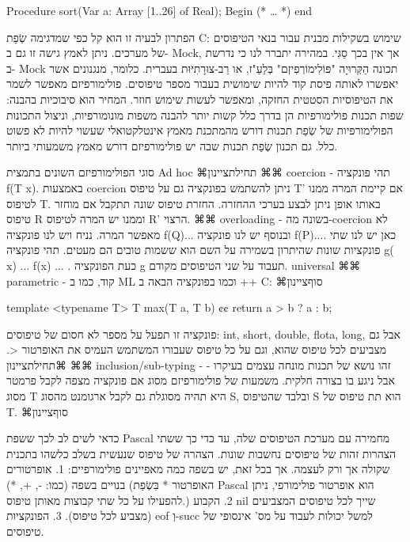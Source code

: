       Procedure sort(Var a: Array [1..26] of Real);
      Begin
      (* … *)
      end

      הפתרון לבעיה זו הוא קל כפי שמדגימה שְׂפַת C: שימוש בשקילות מבנית עבור בנאי הטיפוסים של מערכים. ניתן לאמץ גישה זו גם ב- Mock, אך אין בכך סַגִּי. במהירה יתברר לנו כי נדרשת ב- Mock תכונה הַקְּרוּיָה "פּוֹלִימוֹרְפִיזְם" בְּלַעַ"ז, או רַב-צוּרָתִיּוּת בעברית. כלומר, מנגנונים אשר יאפשרו לאותה פיסת קוד להיות שימושית בעבור מספר טיפוסים. פולימורפיזם מאפשר לשמר את הטיפוסיות הסטטית החזקה, ומאפשר לעשות שימוש חוזר.
      המחיר הוא סיבוכיות בהבנה: שפות תכנות פולימורפיות הן בדרך כלל קשות יותר להבנה משפות מונומורפיות, וניצול התכונות הפולימורפיות של שְׂפַת תכנות דורש מהמתכנת מאמץ אינטלקטואלי שעשוי להיות לא פשוט כלל. גם תכנון שְׂפַת תכנות שבה יש פולימורפיזם דורש מאמץ משמעותי ביותר.

      סוגי הפולימורפיזם השונים בתמצית
      Ad hoc
      ⌘תחילת{ציינון}
      ⌘⌘ coercion - תהי פונקציה f(T x){}. באמצעות coercion ניתן להשתמש בפונקציה גם על טיפוס T' אם קיימת המרה ממנו לטיפוס T. באותו אופן ניתן לבצע בערכי ההחזרה.
      החזרת טיפוס שונה תתקבל אם מוחזר טיפוס R וממנו יש המרה לטיפוס R' הרצוי.
      ⌘⌘ overloading - בשונה מה-coercion לא מאפשר המרה. נניח ויש לנו פונקציה f(Q){...} ובנוסף יש לנו פונקציה f(P){...}. כאן יש לנו שתי פונקציות שונות שהיתרון בשמירה על השם הוא ששמות טובים הם מעטים.
      תהי פונקציה g( x){ ... f(x) ... }. כעת הפונקציה g תעבוד על שני הטיפוסים מקודם.
      universal
      ⌘⌘ parametric - קוד, כמו ב ML וכמו בפונקציה הבאה ב ++ C:
    ⌘סוף{ציינון}

      template <typename T>
      T max(T a, T b) {¢¢
        return a > b ? a : b;
      }

      פונקציה זו תפעל על מספר לא חסום של טיפוסים: int, short, double, flota, long, אבל גם מצביעים לכל טיפוס שהוא, וגם על כל טיפוס שעבורו המשתמש העמיס את האופרטור <.
      ⌘תחילת{ציינון}
      ⌘⌘ inclusion/sub-typing - זהו נושא של תכנות מונחה עצמים בעיקרו - אבל ניגע בו בצורה חלקית. משמעות של פולימורפיזם מסוג אם פונקציה מצפה לקבל פרמטר מסוג T היא תהיה מסוגלת גם לקבל ארגומנט מהסוג S, ובלבד שהטיפוס S הוא תת טיפוס של T.
    ⌘סוף{ציינון}

      כדאי לשים לב לכך ששפת Pascal מחמירה עם מערכת הטיפוסים שלה, עד כדי כך ששתי הצהרות זהות של טיפוסים נחשבות שונות. הצהרה של טיפוס שנעשית בשלב כלשהו בתכנית שקולה אך ורק לעצמה. אך בכל זאת, יש בשפה כמה מאפיינים פולימורפיים:
      1. אופרטורים בנויים בשפה (כמו: -, +, *) (האופרטור * בִּשְׂפַת Pascal הוא אופרטור פולימורפי, ניתן להפעילו על כל שתי קבוצות מאותן טיפוס.)
      2. הקבוע nil שייך לכל טיפוסים המצביעים (מצביע לכל טיפוס).
      3. הפונקציות eof וְ-succ למשל יכולות לעבוד על מס' אינסופי של טיפוסים.

